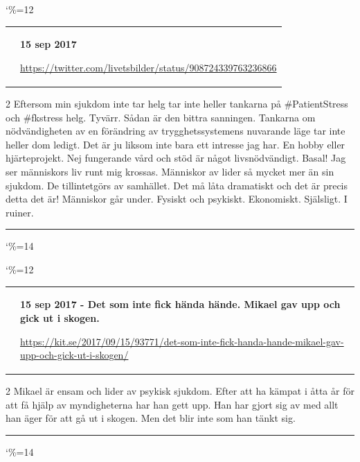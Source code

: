 \documentclass[a4paper]{article}
\makeatletter
\newcommand{\entry}{
\catcode`\%=12
\@entry}
\newcommand{\@entry}[3]{
\bigskip
\begin{tabular*}{\textwidth}{l m{\textwidth-4cm}}
\qrcode{#3} & \textbf{#1}

\medskip

\url{#3}

\end{tabular*}

\medskip


\begin{multicols}{2}
#2
\end{multicols}

\medskip
\hrule

\catcode`\%=14
}
\makeatother
\begin{document}
\entry{15 sep 2017}{Eftersom min sjukdom inte tar helg tar inte heller tankarna på \#PatientStress och \#fkstress helg. Tyvärr. Sådan är den bittra sanningen. Tankarna om nödvändigheten av en förändring av trygghetssystemens nuvarande läge tar inte heller dom ledigt. Det är ju liksom inte bara ett intresse jag har. En hobby eller hjärteprojekt. Nej fungerande vård och stöd är något livsnödvändigt. Basal! Jag ser människors liv runt mig krossas. Människor av lider så mycket mer än \say{bara} sin sjukdom. De tillintetgörs av samhället. Det må låta dramatiskt och det är precis detta det är! Människor går under. Fysiskt och psykiskt. Ekonomiskt. Själsligt. I ruiner.}{https://twitter.com/livetsbilder/status/908724339763236866}

\entry{15 sep 2017 - Det som inte fick hända hände. Mikael gav upp och gick ut i skogen.}{Mikael är ensam och lider av psykisk sjukdom. Efter att ha kämpat i åtta år för att få hjälp av myndigheterna har han gett upp. Han har gjort sig av med allt han äger för att gå ut i skogen. Men det blir inte som han tänkt sig.}{https://kit.se/2017/09/15/93771/det-som-inte-fick-handa-hande-mikael-gav-upp-och-gick-ut-i-skogen/}
\end{document}
